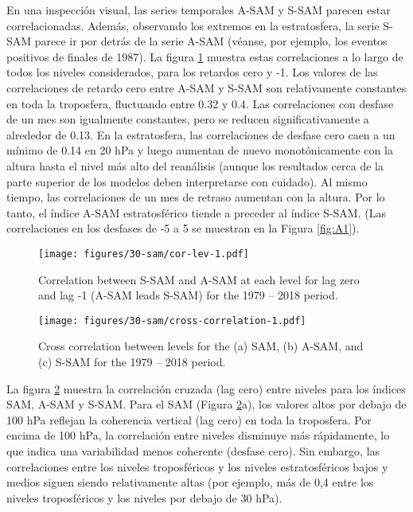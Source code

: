 \documentclass[12pt,oneside]{reedthesis}
\begin{document}
En una inspección visual, las series temporales A\nobreakdash-SAM y S\nobreakdash-SAM parecen estar correlacionadas.
Además, observando los extremos en la estratosfera, la serie S\nobreakdash-SAM parece ir por detrás de la serie A\nobreakdash-SAM (véanse, por ejemplo, los eventos positivos de finales de 1987).
La figura \ref{fig:cor-lev} muestra estas correlaciones a lo largo de todos los niveles considerados, para los retardos cero y -1.
Los valores de las correlaciones de retardo cero entre A\nobreakdash-SAM y S\nobreakdash-SAM son relativamente constantes en toda la troposfera, fluctuando entre 0.32 y 0.4.
Las correlaciones con desfase de un mes son igualmente constantes, pero se reducen significativamente a alrededor de 0.13.
En la estratosfera, las correlaciones de desfase cero caen a un mínimo de 0.14 en 20 hPa y luego aumentan de nuevo monotónicamente con la altura hasta el nivel más alto del reanálisis (aunque los resultados cerca de la parte superior de los modelos deben interpretarse con cuidado).
Al mismo tiempo, las correlaciones de un mes de retraso aumentan con la altura.
Por lo tanto, el índice A\nobreakdash-SAM estratosférico tiende a preceder al índice S\nobreakdash-SAM.
(Las correlaciones en los desfases de -5 a 5 se muestran en la Figura \ref{fig:A1}).
\begin{figure}
\centering
\texttt{[image: figures/30-sam/cor-lev-1.pdf]}
\caption{\label{fig:cor-lev}Correlation between S-SAM and A-SAM at each level for lag zero and lag -1 (A-SAM leads S-SAM) for the 1979 -- 2018 period.}
\end{figure}
\begin{figure}
\centering
\texttt{[image: figures/30-sam/cross-correlation-1.pdf]}
\caption{\label{fig:cross-correlation}Cross correlation between levels for the (a) SAM, (b) A-SAM, and (c) S-SAM for the 1979 -- 2018 period.}
\end{figure}
La figura \ref{fig:cross-correlation} muestra la correlación cruzada (lag cero) entre niveles para los índices SAM, A\nobreakdash-SAM y S\nobreakdash-SAM.
Para el SAM (Figura \ref{fig:cross-correlation}a), los valores altos por debajo de 100 hPa reflejan la coherencia vertical (lag cero) en toda la troposfera.
Por encima de 100 hPa, la correlación entre niveles disminuye más rápidamente, lo que indica una variabilidad menos coherente (desfase cero).
Sin embargo, las correlaciones entre los niveles troposféricos y los niveles estratosféricos bajos y medios siguen siendo relativamente altas (por ejemplo, más de 0,4 entre los niveles troposféricos y los niveles por debajo de 30 hPa).
\end{document}
